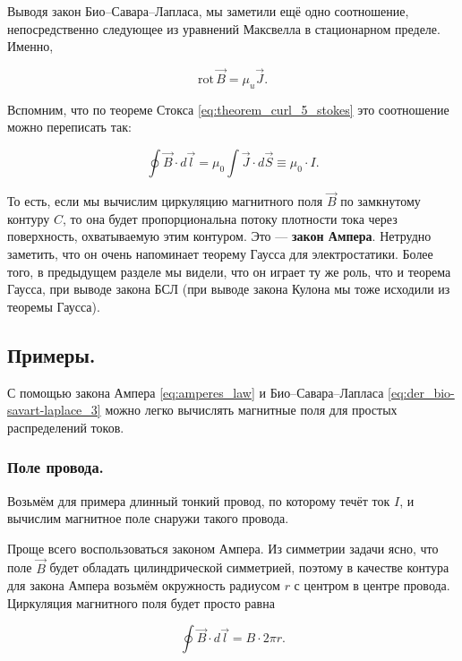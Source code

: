 \documentclass[11pt,a4paper]{article}
\numberwithin{equation}{section}
\newcommand{\rot}{\mathrm{rot}\,}
\begin{document}
Выводя закон Био--Савара--Лапласа, мы заметили ещё одно соотношение,
непосредственно следующее из уравнений Максвелла в стационарном
пределе. Именно, 

\begin{equation}
  \label{eq:der_amperes_law}
  \rot \vec{B} = \mu_u \vec{J}.
\end{equation}

Вспомним, что по теореме Стокса \eqref{eq:theorem_curl_5_stokes} это
соотношение можно переписать так: 

\begin{equation}
  \label{eq:amperes_law}
  \oint \vec{B} \cdot d \vec{l} = \mu_0 \int \vec{J} \cdot d\vec{S} \equiv
  \mu_0 \cdot I.
\end{equation}

То есть, если мы вычислим циркуляцию магнитного поля $\vec{B}$ по
замкнутому контуру $C$, то она будет пропорциональна потоку плотности
тока через поверхность, охватываемую этим контуром. Это ---
\textbf{закон Ампера}. Нетрудно заметить, что он очень напоминает
теорему Гаусса для электростатики. Более того, в предыдущем разделе мы
видели, что он играет ту же роль, что и теорема Гаусса, при выводе
закона БСЛ (при выводе закона Кулона мы тоже исходили из теоремы
Гаусса). 

\subsection{Примеры.}
\label{sec:magnetostatics_examples}

С помощью закона Ампера \eqref{eq:amperes_law} и Био--Савара--Лапласа
\eqref{eq:der_bio-savart-laplace_3} можно легко вычислять магнитные
поля для простых распределений токов. 

\subsubsection{Поле провода. }
\label{sec:mfield_wire}

Возьмём для примера длинный тонкий провод, по которому течёт ток $I$,
и вычислим магнитное поле снаружи такого провода.

Проще всего воспользоваться законом Ампера. Из симметрии задачи ясно,
что поле $\vec{B}$ будет обладать цилиндрической симметрией, поэтому в
качестве контура для закона Ампера возьмём окружность радиусом $r$ с
центром в центре провода. Циркуляция магнитного поля будет просто
равна

\begin{equation}
  \label{eq:mfield_thin_current_1}
  \oint \vec{B} \cdot d \vec{l} = B \cdot 2 \pi r.
\end{equation}
\end{document}

